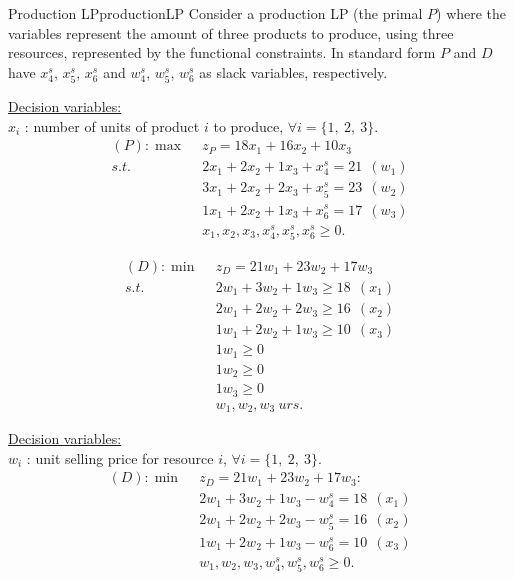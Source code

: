 \begin{example}{Production LP}{productionLP}
Consider a production LP (the primal $P$) where the variables represent the amount of three products to produce, using three resources, represented by the functional constraints.   In standard form $P$ and $D$ have $x^s_4$, $x^s_5$, $x^s_6$ and $w^s_4$, $w^s_5$, $w^s_6$ as slack variables, respectively. %
\end{example}
\begin{solution}
\vspace{3mm}\underline{Decision variables:} \\
$x_i$ : number of units of product $i$ to produce, $\forall i = \{1,~2,~3\}$.
\begin{align*}
(P): \max~~  & z_P = 18x_1 + 16x_2 + 10x_3 \\
{s.t.}~~& 2x_1 + 2x_2 + 1x_3  +x^{s}_4 = 21~~ (w_1) \\
& 3x_1 + 2x_2 + 2x_3 + x^{s}_5 = 23~~ (w_2)  \\
&  1x_1 + 2x_2 + 1x_3  + x^{s}_6 = 17~~ (w_3) \\
& x_1, x_2, x_3, x^{s}_4, x^{s}_5, x^{s}_6 \ge 0.
\end{align*} 

\begin{align*}
(D): \min~~ & z_D =21w_1 +23w_2 +17w_3  \\
{s.t.}~~ & 2w_1 +3w_2 + 1w_3 \ge 18 ~~ (x_1) \\
& 2w_1 +2w_2 + 2w_3 \ge 16 ~~ (x_2)\\
& 1w_1 +2w_2 + 1w_3 \ge 10 ~~ (x_3)\\
& 1w_1 \ge 0 \\
& 1w_2 \ge 0 \\
& 1w_3 \ge 0 \\
& w_1, w_2, w_3~urs.
\end{align*}

\underline{Decision variables:} \\
$w_i$ : unit selling price for resource $i$, $\forall i = \{1,~2,~3\}$.
\begin{align*}
(D): \min~~ & z_D =21w_1 +23w_2 +17w_3:  \\
& 2w_1 +3w_2 + 1w_3 - w^{s}_4 = 18 ~~ (x_1) \\
& 2w_1 +2w_2 + 2w_3 - w^{s}_5 = 16 ~~ (x_2)\\
& 1w_1 +2w_2 + 1w_3 - w^{s}_6 = 10 ~~ (x_3)\\
& w_1, w_2, w_3, w^{s}_4, w^{s}_5, w^{s}_6 \ge 0. 
\end{align*}


\end{solution}
